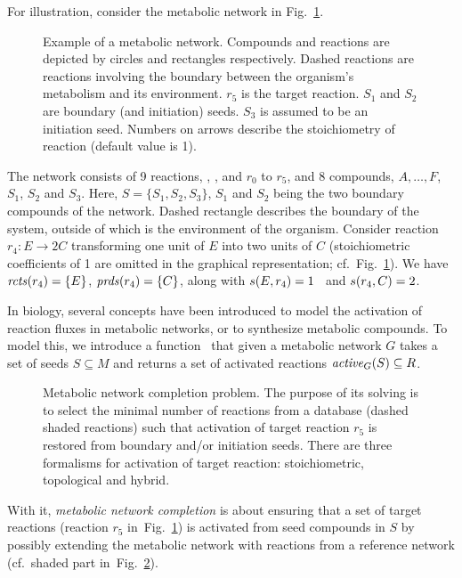 For illustration, consider the metabolic network in Fig.~\ref{gra:toy_d}.
%
\begin{figure}[t]
  \centering
    
    \caption{Example of a metabolic network. Compounds and reactions are depicted by circles and rectangles respectively. Dashed reactions are reactions involving the boundary between the organism's metabolism and its environment. $r_5$ is the target reaction. $S_1$ and $S_2$ are boundary (and initiation) seeds. $S_3$ is assumed to be an initiation seed. Numbers on arrows describe the stoichiometry of reaction (default value is 1).}
    \label{gra:toy_d}
\end{figure}
%
The network consists of 9 reactions, \SeedReaction, \SeedReactiont, \ExportReaction{} and $r_0$ to $r_5$, and 8 compounds, $A,\dots,F$, $S_1$, $S_2$ and $S_3$.
Here, $S=\{S_1,S_2,S_3\}$, $S_1$ and $S_2$ being the two boundary compounds of the network. Dashed rectangle describes the boundary of the system, outside of which is the environment of the organism.
%
Consider reaction
\(
r_4 : E\rightarrow 2C
\)
transforming one unit of $E$ into two units of $C$ (stoichiometric coefficients of 1 are omitted in the graphical representation; cf.~Fig.~\ref{gra:toy_d}).
%
We have
$\mathit{rcts}(r_4)=\{E\}$,
$\mathit{prds}(r_4)=\{C\}$,
along with $s(E,r_4)=1 $
\ and $s(r_4,C)=2$.

In biology, several concepts have been introduced to model the activation of reaction fluxes in metabolic networks,
or to synthesize metabolic compounds.
%
To model this,
we introduce a function \ActivityFunction\ that given a metabolic network $G$ takes a set of seeds $S \subseteq M$ and returns a set of activated
reactions $\mathit{active}_{G}(S) \subseteq R$.
%
%
\begin{figure}[t]
  \centering
    
    \caption{Metabolic network completion problem. The purpose of its solving is to select the minimal number of reactions from a database (dashed shaded reactions) such that activation of target reaction $r_5$ is restored from boundary and/or initiation seeds. There are three formalisms for activation of target reaction: stoichiometric, topological and hybrid.}
    \label{gra:toy}
\end{figure}
%
With it,
\emph{metabolic network completion} is about ensuring that a set of target reactions (reaction $r_5$ in~Fig.~\ref{gra:toy_d}) is activated from seed compounds in $S$
by possibly extending the metabolic network with reactions from a reference network (cf.\ shaded part in~Fig.~\ref{gra:toy}).

